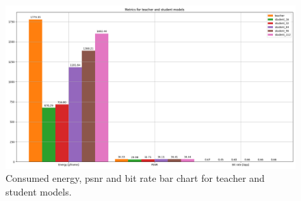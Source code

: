 \begin{figure}
    \centering
    \includegraphics[width=15cm]{../img/kd_lic_bar_energy.png}
    \caption[Consumed energy, \acrshort{psnr} and bit rate bar chart for teacher and student models.]{Consumed energy, \acrshort{psnr} and bit rate bar chart for teacher and student models.}
    \label{appendix:kd_lic_bar_energy}
\end{figure}

